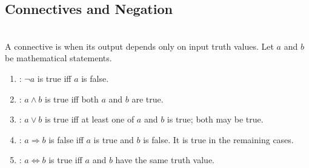 \subsection{Connectives and Negation}

\begin{definition} \label{def:truth-functional-connectives} \\
A connective is  when its output depends only on input truth values. Let $a$ and $b$ be mathematical statements.
\begin{enumerate}[label=(\roman*)]
\setlength{\itemsep}{0pt}
\item {}: $\neg a$ is true iff $a$ is false.
\item {}: $a\land b$ is true iff both $a$ and $b$ are true.
\item {}: $a\lor b$ is true iff at least one of $a$ and $b$ is true; both may be true.
\item {}: $a\Rightarrow b$ is false iff $a$ is true and $b$ is false. It is true in the remaining cases.
\item {}: $a\Longleftrightarrow b$ is true iff $a$ and $b$ have the same truth value.
\end{enumerate}
\end{definition}

